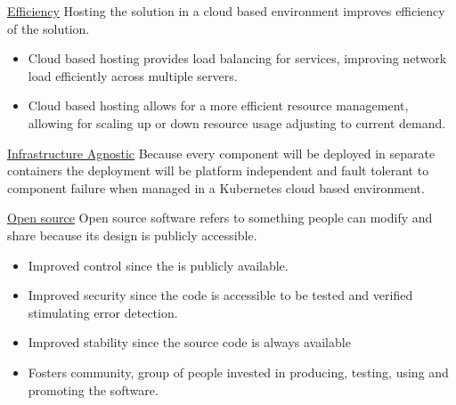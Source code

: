 \begin{description}[font=$\bullet$~\normalfont\scshape\color{red!50!black}]
\item \underline{Efficiency}    
        Hosting the solution in a cloud based environment improves efficiency of the solution. 
		\begin{itemize}
			\item Cloud based hosting provides load balancing for services, improving network load efficiently across multiple servers.
			\item Cloud based hosting allows for a more efficient resource management, allowing for scaling up or down resource usage adjusting to current demand.
		\end{itemize}		        
         

\item \underline{Infrastructure Agnostic}     
        Because every component will be deployed in separate containers the deployment will be platform independent and fault tolerant to component failure when managed in a Kubernetes cloud based environment.

\item \underline{Open source}     
        Open source software refers to something people can modify and share because its design is publicly accessible.
        \begin{itemize}
        	\item Improved control since the is publicly available.
        	\item Improved security since the code is accessible to be tested and verified stimulating error detection.
        	\item Improved stability since the source code is always available
        	\item Fosters community, group of people invested in producing, testing, using and promoting the software.
        \end{itemize}

\end{description}